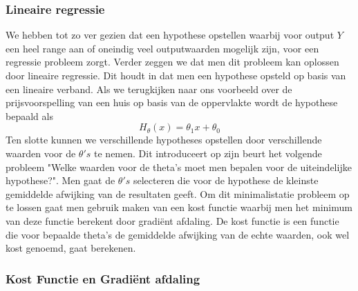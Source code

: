 \subsubsection{Lineaire regressie}\label{lineaire regressie}

We hebben tot zo ver gezien dat een hypothese opstellen waarbij voor output $Y$ een heel range aan of oneindig veel outputwaarden mogelijk zijn, voor een regressie probleem zorgt. Verder zeggen we dat men dit probleem kan oplossen door lineaire regressie. Dit houdt in dat men een hypothese opsteld op basis van een lineaire verband.
%
Als we terugkijken naar ons voorbeeld over de prijsvoorspelling van een huis op basis van de oppervlakte wordt de hypothese bepaald als
\[H_{\theta}(x) = \theta_{1}x + \theta_{0}\]
%
Ten slotte kunnen we verschillende hypotheses opstellen door verschillende waarden voor de $\theta's$ te nemen. Dit introduceert op zijn beurt het volgende probleem "Welke waarden voor de theta's moet men bepalen voor de uiteindelijke hypothese?". Men gaat de $\theta's$ selecteren die voor de hypothese de kleinste gemiddelde afwijking van de resultaten geeft. Om dit minimalistatie probleem op te lossen gaat men gebruik maken van een kost functie  waarbij men het minimum van deze functie berekent door gradi\"ent afdaling. De kost functie is een functie die voor bepaalde theta's de gemiddelde afwijking van de echte waarden, ook wel kost genoemd, gaat berekenen.  


\subsubsection{Kost Functie en Gradi\"ent afdaling}\label{Kost Functie en Gradule afdaling}

